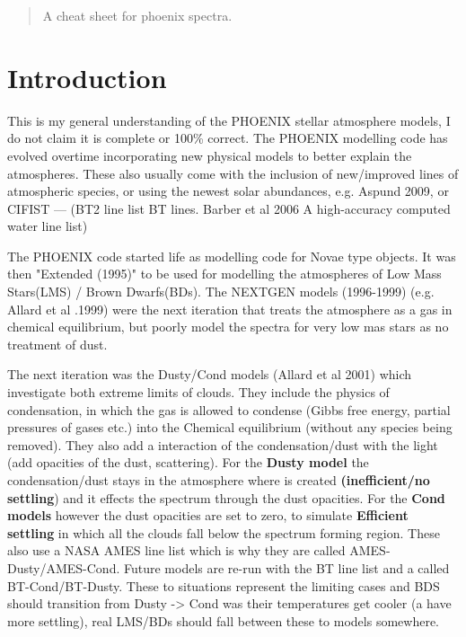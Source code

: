 \documentclass[12pt, a4paper]{article}
\begin{document}
\maketitle

\begin{abstract}
A cheat sheet for phoenix spectra.
\end{abstract}

\section{Introduction}

This is my general understanding of the PHOENIX stellar atmosphere models, I do not claim it is complete or  100\% correct. The PHOENIX modelling code has evolved overtime incorporating new physical models to better explain the atmospheres. These also usually come with the inclusion of new/improved lines of atmospheric species, or using the newest solar abundances, e.g. Aspund 2009, or CIFIST --- (BT2 line list BT lines. Barber et al 2006 A high-accuracy computed water line list)

The PHOENIX code started life as modelling code for Novae type objects. It was then "Extended (1995)" to be used for modelling the atmospheres of Low Mass Stars(LMS) / Brown Dwarfs(BDs). 
The NEXTGEN models (1996-1999) (e.g. Allard et al .1999) were the next iteration that treats the atmosphere as a gas in chemical equilibrium,  but poorly model the spectra for very low mas stars as no treatment of dust.

The next iteration was the Dusty/Cond models (Allard et al 2001) which investigate both extreme limits of clouds. They include the physics of condensation, in which the gas is allowed to condense (Gibbs free energy, partial pressures of gases etc.) into the Chemical equilibrium (without any species being removed). They also add a interaction of the condensation/dust with the light (add opacities of the dust, scattering). For the \textbf{Dusty model} the condensation/dust stays in the atmosphere where is created \textbf{(inefficient/no settling}) and it effects the spectrum through the dust opacities.  For the \textbf{Cond models} however the dust opacities are set to zero, to simulate \textbf{Efficient settling} in which all the clouds fall below the spectrum forming region. These also use a NASA AMES line list which is why they are called AMES-Dusty/AMES-Cond. Future models are re-run with the BT line list and a called BT-Cond/BT-Dusty.
These to situations represent the limiting cases and BDS should transition from Dusty -> Cond was their temperatures get cooler (a have more settling), real LMS/BDs should fall between these to models somewhere. 
\end{document}
